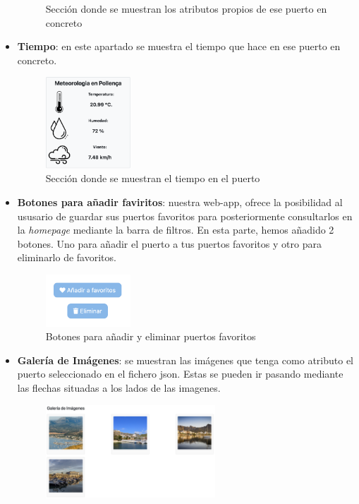 \documentclass{article}
\begin{document}
\begin{itemize}
\begin{figure}[ht]
        \caption{Sección donde se muestran los atributos propios de ese puerto en concreto}
    \end{figure}
    \newpage
    \item \textbf{Tiempo}: en este apartado se muestra el tiempo que hace en ese puerto en concreto.
    \begin{figure}[ht]
        \centering
        \includegraphics[width=0.3\textwidth]{images/tiempo.png}
        \caption{Sección donde se muestran el tiempo en el puerto}
    \end{figure}
    \item \textbf{Botones para añadir faviritos}: nuestra web-app, ofrece la posibilidad al ususario de guardar sus puertos favoritos para posteriormente consultarlos en la \textit{homepage} mediante la barra de filtros. En esta parte, hemos añadido 2 botones. Uno para añadir el puerto a tus puertos favoritos y otro para eliminarlo de favoritos.
    \begin{figure}[ht]
      \centering
      \includegraphics[width=0.3\textwidth]{images/favs.png}
      \caption{Botones para añadir y eliminar puertos favoritos}
  \end{figure}
    \item \textbf{Galería de Imágenes}: se muestran las imágenes que tenga como atributo el puerto seleccionado en el fichero json. Estas se pueden ir pasando mediante las flechas situadas a los lados de las imagenes.
    \begin{figure}[ht]
        \centering
        \includegraphics[width=0.6\textwidth]{images/galeriaImg.png}

\end{figure}
\end{itemize}
\end{document}
